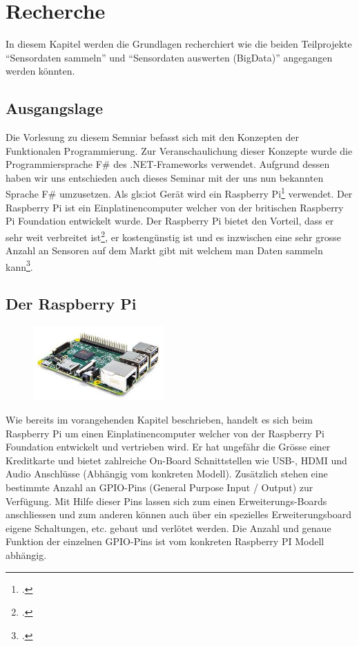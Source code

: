 
\chapter{Recherche}
In diesem Kapitel werden die Grundlagen recherchiert wie die beiden Teilprojekte "`Sensordaten sammeln"' und "`Sensordaten auswerten (BigData)"' angegangen werden könnten.

\section{Ausgangslage}
Die Vorlesung zu diesem Semniar befasst sich mit den Konzepten der Funktionalen Programmierung. Zur Veranschaulichung dieser Konzepte wurde die Programmiersprache F\# des .NET-Frameworks verwendet. Aufgrund dessen haben wir uns entschieden auch dieses Seminar mit der uns nun bekannten Sprache F\# umzusetzen. Als \Gls{gls:iot} Gerät wird ein Raspberry Pi\footcite{Raspberry_Pi_2016-04-24} verwendet. Der Raspberry Pi ist ein Einplatinencomputer welcher von der britischen Raspberry Pi Foundation entwickelt wurde. Der Raspberry Pi bietet den Vorteil, dass er sehr weit verbreitet ist\footcite{Raspberry_Pi_Erfolgsgeschichte_2016-04-24}, er kostengünstig ist und es inzwischen eine sehr grosse Anzahl an Sensoren auf dem Markt gibt mit welchem man Daten sammeln kann\footcite{Raspberry_Pi_Sensor_2016-04-24}.

\section{Der Raspberry Pi}
\label{sec:recherche:rpi}
\begin{figure}[H]
  \centering
  \includegraphics[width=5cm]{./images/RaspberryPi2ModelB}
\end{figure}
  
Wie bereits im vorangehenden Kapitel beschrieben, handelt es sich beim Raspberry Pi um einen Einplatinencomputer welcher von der Raspberry Pi Foundation entwickelt und vertrieben wird. Er hat ungefähr die Grösse einer Kreditkarte und bietet zahlreiche On-Board Schnittstellen wie USB-, HDMI und Audio Anschlüsse (Abhängig vom konkreten Modell). Zusätzlich stehen eine bestimmte Anzahl an GPIO-Pins (General Purpose Input / Output) zur Verfügung. Mit Hilfe dieser Pins lassen sich zum einen Erweiterungs-Boards anschliessen und zum anderen können auch über ein spezielles Erweiterungsboard eigene Schaltungen, etc. gebaut und verlötet werden. Die Anzahl und genaue Funktion der einzelnen GPIO-Pins ist vom konkreten Raspberry PI Modell abhängig.

